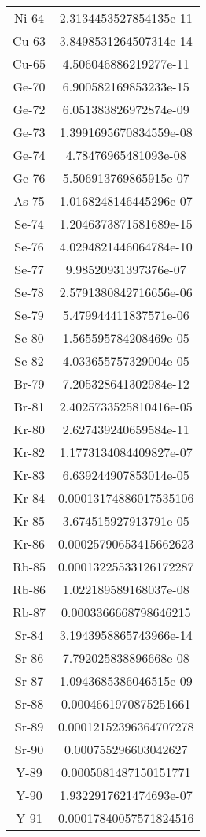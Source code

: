 \begin{table}[h!]
\begin{tabular}{|| c || c |}
Ni-64 & 2.3134453527854135e-11 \\
Cu-63 & 3.8498531264507314e-14 \\
Cu-65 & 4.506046886219277e-11 \\
Ge-70 & 6.900582169853233e-15 \\
Ge-72 & 6.051383826972874e-09 \\
Ge-73 & 1.3991695670834559e-08 \\
Ge-74 & 4.78476965481093e-08 \\
Ge-76 & 5.506913769865915e-07 \\
As-75 & 1.0168248146445296e-07 \\
Se-74 & 1.2046373871581689e-15 \\
Se-76 & 4.0294821446064784e-10 \\
Se-77 & 9.98520931397376e-07 \\
Se-78 & 2.5791380842716656e-06 \\
Se-79 & 5.479944411837571e-06 \\
Se-80 & 1.565595784208469e-05 \\
Se-82 & 4.033655757329004e-05 \\
Br-79 & 7.205328641302984e-12 \\
Br-81 & 2.4025733525810416e-05 \\
Kr-80 & 2.627439240659584e-11 \\
Kr-82 & 1.1773134084409827e-07 \\
Kr-83 & 6.639244907853014e-05 \\
Kr-84 & 0.00013174886017535106 \\
Kr-85 & 3.674515927913791e-05 \\
Kr-86 & 0.00025790653415662623 \\
Rb-85 & 0.00013225533126172287 \\
Rb-86 & 1.022189589168037e-08 \\
Rb-87 & 0.0003366668798646215 \\
Sr-84 & 3.1943958865743966e-14 \\
Sr-86 & 7.792025838896668e-08 \\
Sr-87 & 1.0943685386046515e-09 \\
Sr-88 & 0.0004661970875251661 \\
Sr-89 & 0.00012152396364707278 \\
Sr-90 & 0.000755296603042627 \\
Y-89 & 0.0005081487150151771 \\
Y-90 & 1.9322917621474693e-07 \\
Y-91 & 0.00017840057571824516 \\

\end{tabular}
\end{table}
